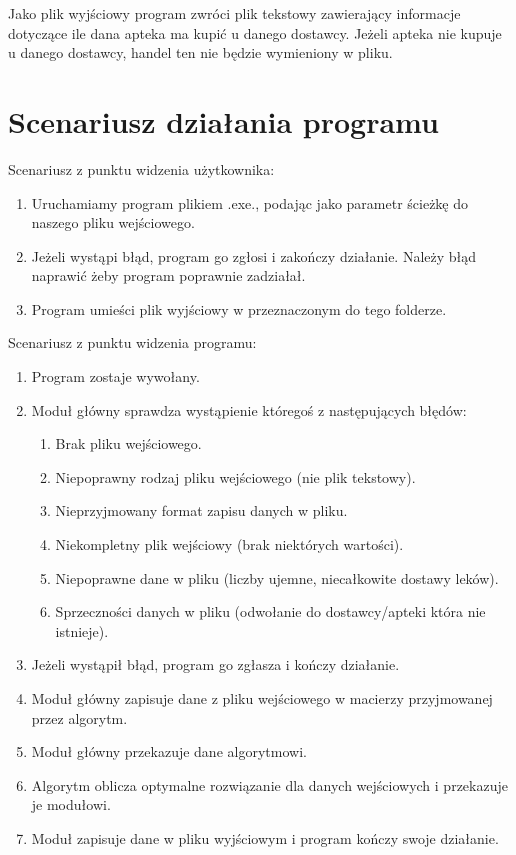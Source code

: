 \documentclass{article}
\begin{document}
Jako plik wyjściowy program zwróci plik tekstowy zawierający informacje dotyczące ile dana apteka ma kupić u danego dostawcy. Jeżeli apteka nie kupuje u danego dostawcy, handel ten nie będzie wymieniony w pliku.

\section{Scenariusz działania programu}

Scenariusz z punktu widzenia użytkownika:

\begin{enumerate}
	\item Uruchamiamy program plikiem .exe., podając jako parametr ścieżkę do naszego pliku wejściowego.
	\item Jeżeli wystąpi błąd, program go zgłosi i zakończy działanie. Należy błąd naprawić żeby program poprawnie zadziałał.
	\item Program umieści plik wyjściowy w przeznaczonym do tego folderze.
\end{enumerate}

\newpage

\noindent Scenariusz z punktu widzenia programu:

\begin{enumerate}
	\item Program zostaje wywołany.
	\item Moduł główny sprawdza wystąpienie któregoś z następujących błędów:
	\begin{enumerate}
		\item Brak pliku wejściowego.
		\item Niepoprawny rodzaj pliku wejściowego (nie plik tekstowy).
		\item Nieprzyjmowany format zapisu danych w pliku.
		\item Niekompletny plik wejściowy (brak niektórych wartości).
		\item Niepoprawne dane w pliku (liczby ujemne, niecałkowite dostawy leków).
		\item Sprzeczności danych w pliku (odwołanie do dostawcy/apteki która nie istnieje).
	\end{enumerate}
	\item Jeżeli wystąpił błąd, program go zgłasza i kończy działanie.
	\item Moduł główny zapisuje dane z pliku wejściowego w macierzy przyjmowanej przez algorytm.
	\item Moduł główny przekazuje dane algorytmowi.
	\item Algorytm oblicza optymalne rozwiązanie dla danych wejściowych i przekazuje je modułowi.
	\item Moduł zapisuje dane w pliku wyjściowym i program kończy swoje działanie.
\end{enumerate}
\end{document}
